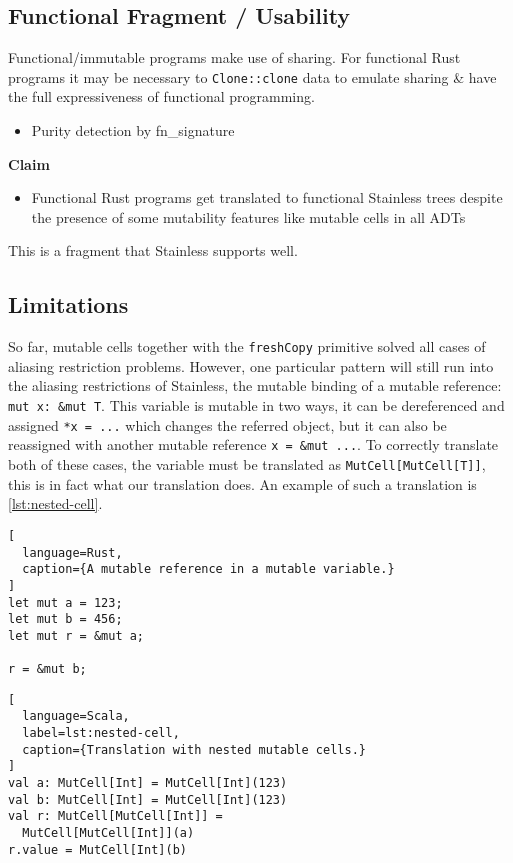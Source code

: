 \subsection{Functional Fragment / Usability}

Functional/immutable programs make use of sharing. For functional Rust
programs it may be necessary to \passthrough{\lstinline!Clone::clone!}
data to emulate sharing \& have the full expressiveness of functional
programming.

\begin{itemize}
\tightlist
\item
  Purity detection by fn\_signature
\end{itemize}

\textbf{Claim}

\begin{itemize}
\tightlist
\item
  Functional Rust programs get translated to functional Stainless trees
  despite the presence of some mutability features like mutable cells in
  all ADTs
\end{itemize}

This is a fragment that Stainless supports well.


\subsection{Limitations}
\label{trans-limitations}

So far, mutable cells together with the \lstinline!freshCopy! primitive solved
all cases of aliasing restriction problems. However, one particular pattern will
still run into the aliasing restrictions of Stainless, the mutable binding of a
mutable reference: \passthrough{\lstinline!mut x: &mut T!}. This variable is
mutable in two ways, it can be dereferenced and assigned \lstinline!*x = ...!
which changes the referred object, but it can also be reassigned with another
mutable reference \lstinline!x = &mut ...!. To correctly translate both of these
cases, the variable must be translated as \lstinline!MutCell[MutCell[T]]!, this
is in fact what our translation does. An example of such a translation is
\autoref{lst:nested-cell}.

\noindent\begin{minipage}[t]{.35\textwidth}
\begin{lstlisting}[
  language=Rust,
  caption={A mutable reference in a mutable variable.}
]
let mut a = 123;
let mut b = 456;
let mut r = &mut a;

r = &mut b;
\end{lstlisting}
\end{minipage}\hfill
\begin{minipage}[t]{.6\textwidth}
\begin{lstlisting}[
  language=Scala,
  label=lst:nested-cell,
  caption={Translation with nested mutable cells.}
]
val a: MutCell[Int] = MutCell[Int](123)
val b: MutCell[Int] = MutCell[Int](123)
val r: MutCell[MutCell[Int]] =
  MutCell[MutCell[Int]](a)
r.value = MutCell[Int](b)
\end{lstlisting}
\end{minipage}

